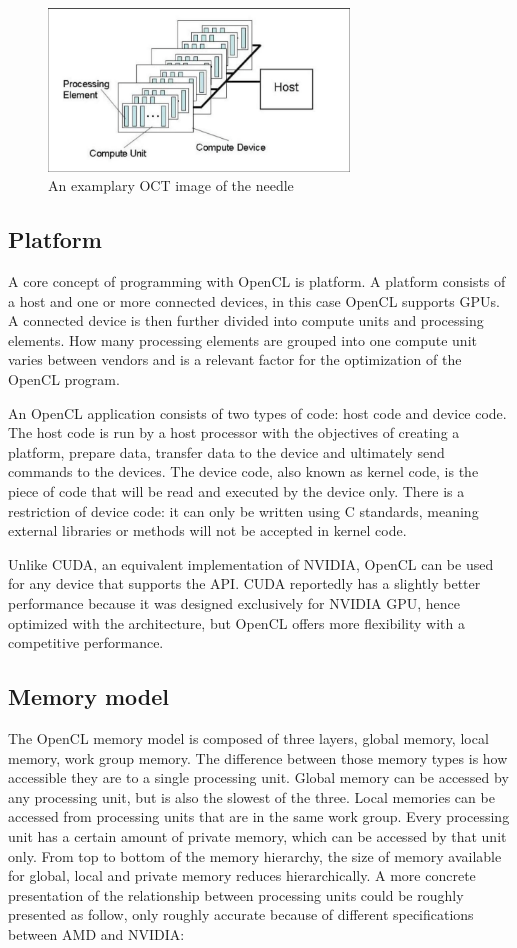 \begin{figure}[H]
	\centering
	\includegraphics[width=8cm]{images/OpenCLModel.png}
	\caption{An examplary OCT image of the needle}
	\label{ExampleOCTImage}
\end{figure}
\pagebreak
\subsection{Platform}
A core concept of programming with OpenCL is platform. A platform consists of a host and one or more connected devices, in this case OpenCL supports GPUs. A connected device is then further divided into compute units and processing elements. How many processing elements  are grouped into one compute unit varies between vendors and is a relevant factor for the optimization of the OpenCL program. 

An OpenCL application consists of two types of code: host code and device code. The host code is run by a host processor with the objectives of creating a platform, prepare data, transfer data to the device and ultimately send commands to the devices. The device code, also known as kernel code, is the piece of code that will be read and executed by the device only. There is a restriction of device code: it can only be written using C standards, meaning external libraries or methods will not be accepted in kernel code. 

Unlike CUDA, an equivalent implementation of NVIDIA, OpenCL can be used for any device that supports the API. CUDA reportedly has a slightly better performance because it was  designed exclusively for NVIDIA GPU, hence optimized with the architecture, but OpenCL offers more flexibility with a competitive performance. 
\subsection{Memory model}
The OpenCL memory model is composed of three layers, global memory, local memory, work group memory. The difference between those memory types is how accessible they are to a single processing unit. Global memory can be accessed by any processing unit, but is also the slowest of the three. Local memories can be accessed from processing units that are in the same work group. Every processing unit has a certain amount of private memory, which can be accessed by that unit only. From top to bottom of the memory hierarchy, the size of memory available for global, local and private memory reduces hierarchically. A more concrete presentation of the relationship between processing units could be roughly presented as follow, only roughly accurate because of different specifications between AMD and NVIDIA:

